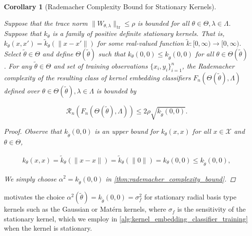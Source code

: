 \documentclass{article}
\newtheorem{corollary}[theorem]{Corollary}
\begin{document}
		\begin{corollary}[Rademacher Complexity Bound for Stationary Kernels]
		\label{thm:rademacher_complexity_stationary_kernels_bound}
	
			Suppose that the trace norm $\| W_{\theta, \lambda} \|_{\mathrm{tr}} \leq \rho$ is bounded for all $\theta \in \Theta, \lambda \in \Lambda$. Suppose that $k_{\theta}$ is a family of positive definite stationary kernels. That is, $k_{\theta} (x, x') = \tilde{k}_{\theta}( \| x - x' \| )$ for some real-valued function $\tilde{k} : [0, \infty) \to [0, \infty)$. Select $\tilde{\theta} \in \Theta$ and define $\Theta(\tilde{\theta})$ such that $k_{\theta}(0, 0) \leq k_{\tilde{\theta}}(0, 0)$ for all $\theta \in \Theta(\tilde{\theta})$. For any $\tilde{\theta} \in \Theta$ and set of training observations $\{x_{i}, y_{i}\}_{i = 1}^{n}$, the Rademacher complexity of the resulting class of kernel embedding classifiers $F_{n}(\Theta(\tilde{\theta}), \Lambda)$ defined over $\theta \in \Theta(\tilde{\theta}), \lambda \in \Lambda$ is bounded by
		
			\begin{equation}
				\mathcal{R}_{n}(F_{n}(\Theta(\tilde{\theta}), \Lambda)) \leq 2 \rho \sqrt{k_{\tilde{\theta}}(0, 0)}.
			\end{equation}
			
			\begin{proof}
				
				Observe that $k_{\tilde{\theta}}(0, 0)$ is an upper bound for $k_{\theta}(x, x)$ for all $x \in \mathcal{X}$ and $\theta \in \Theta$,
				
				\begin{equation}
					\begin{aligned}
						k_{\theta}(x, x) = \tilde{k}_{\theta}( \| x - x \| ) = \tilde{k}_{\theta}( \| 0 \| ) = k_{\theta}(0, 0) \leq k_{\tilde{\theta}}(0, 0),
					\end{aligned}
				\end{equation}
				
				We simply choose $\alpha^{2} = k_{\tilde{\theta}}(0, 0)$ in \cref{thm:rademacher_complexity_bound}.
			\end{proof}
		
		\end{corollary}
	
		 motivates the choice $\alpha^{2}(\tilde{\theta}) = k_{\tilde{\theta}}(0, 0) = \sigma_{f}^{2}$ for stationary radial basis type kernels such as the Gaussian or Mat\'{e}rn kernels, where $\sigma_{f}$ is the sensitivity \citep{rasmussen2006gaussian} of the stationary kernel, which we employ in \cref{alg:kernel_embedding_classifier_training} when the kernel is stationary.
		
\end{document}
